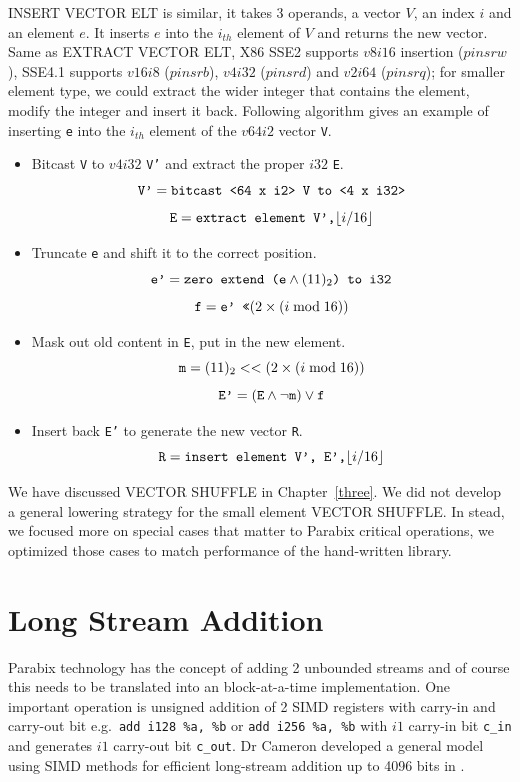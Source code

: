 INSERT VECTOR ELT is similar, it takes 3 operands, a vector $V$, an index $i$ and an element $e$. It inserts $e$ into the $i_{th}$ element of $V$ and returns the new vector. Same as EXTRACT VECTOR ELT, X86 SSE2 supports $v8i16$ insertion ($pinsrw$), SSE4.1 supports $v16i8$ ($pinsrb$), $v4i32$ ($pinsrd$) and $v2i64$ ($pinsrq$); for smaller element type, we could extract the wider integer that contains the element, modify the integer and insert it back. Following algorithm gives an example of inserting {\tt e} into the $i_{th}$ element of the $v64i2$ vector {\tt V}.

\begin{itemize}
  \item Bitcast {\tt V} to $v4i32$ {\tt V'} and extract the proper $i32$ {\tt E}.
  \[\text{\tt V'} = \text{\tt bitcast <64 x i2> V to <4 x i32>} \]
  \[\text{\tt E} = \text{\tt extract element V',} \lfloor i / 16 \rfloor \]

  \item Truncate {\tt e} and shift it to the correct position.
  \[\text{\tt e'} = \text{\tt zero extend (e} \land (11)_2 \text{\tt ) to i32} \]
  \[\text{\tt f} = \text{\tt e' <<} (2 \times (i \bmod 16))\]

  \item Mask out old content in {\tt E}, put in the new element.
  \[\text{\tt m} = (11)_2 << (2 \times (i \bmod 16)) \]
  \[\text{\tt E'} = (\text{\tt E} \land \lnot \text{\tt m}) \lor \text{\tt f}\]

  \item Insert back {\tt E'} to generate the new vector {\tt R}.
  \[\text{\tt R} = \text{\tt insert element V', E',} \lfloor i / 16 \rfloor \]
\end{itemize}

We have discussed VECTOR SHUFFLE in Chapter~\ref{three}. We did not develop a general lowering strategy for the small element VECTOR SHUFFLE\@. In stead, we focused more on special cases that matter to Parabix critical operations, we optimized those cases to match performance of the hand-written library.

\section{Long Stream Addition}
Parabix technology has the concept of adding 2 unbounded streams and of course this needs to be translated into an block-at-a-time implementation\cite{rob_regex}. One important operation is unsigned addition of 2 SIMD registers with carry-in and carry-out bit e.g.\ \verb|add i128 %a, %b| or \verb|add i256 %a, %b| with $i1$ carry-in bit \verb:c_in: and generates $i1$ carry-out bit \verb:c_out:. Dr Cameron developed a general model using SIMD methods for efficient long-stream addition up to 4096 bits in \cite{rob_regex}.

